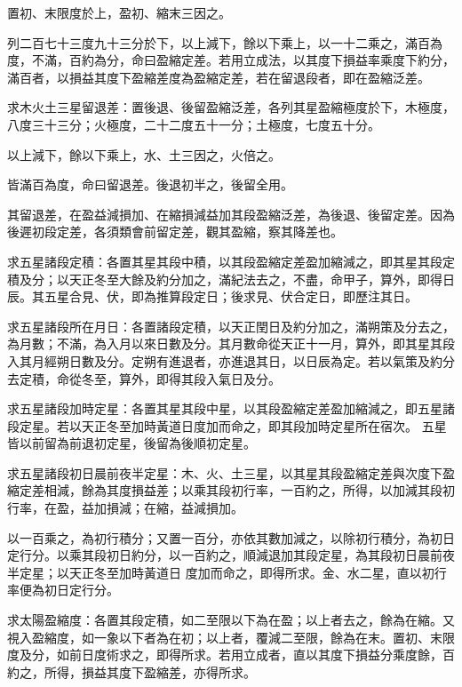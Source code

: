 \begin{pinyinscope}
 置初、末限度於上，盈初、縮末三因之。



 列二百七十三度九十三分於下，以上減下，餘以下乘上，以一十二乘之，滿百為度，不滿，百約為分，命曰盈縮定差。若用立成法，以其度下損益率乘度下約分，滿百者，以損益其度下盈縮差度為盈縮定差，若在留退段者，即在盈縮泛差。



 求木火土三星留退差：置後退、後留盈縮泛差，各列其星盈縮極度於下，木極度，八度三十三分；火極度，二十二度五十一分；土極度，七度五十分。



 以上減下，餘以下乘上，水、土三因之，火倍之。



 皆滿百為度，命曰留退差。後退初半之，後留全用。



 其留退差，在盈益減損加、在縮損減益加其段盈縮泛差，為後退、後留定差。因為後遲初段定差，各須類會前留定差，觀其盈縮，察其降差也。



 求五星諸段定積：各置其星其段中積，以其段盈縮定差盈加縮減之，即其星其段定積及分；以天正冬至大餘及約分加之，滿紀法去之，不盡，命甲子，算外，即得日辰。其五星合見、伏，即為推算段定日；後求見、伏合定日，即歷注其日。



 求五星諸段所在月日：各置諸段定積，以天正閏日及約分加之，滿朔策及分去之，為月數；不滿，為入月以來日數及分。其月數命從天正十一月，算外，即其星其段入其月經朔日數及分。定朔有進退者，亦進退其日，以日辰為定。若以氣策及約分去定積，命從冬至，算外，即得其段入氣日及分。



 求五星諸段加時定星：各置其星其段中星，以其段盈縮定差盈加縮減之，即五星諸段定星。若以天正冬至加時黃道日度加而命之，即其段加時定星所在宿次。
 五星皆以前留為前退初定星，後留為後順初定星。



 求五星諸段初日晨前夜半定星：木、火、土三星，以其星其段盈縮定差與次度下盈縮定差相減，餘為其度損益差；以乘其段初行率，一百約之，所得，以加減其段初行率，在盈，益加損減；在縮，益減損加。



 以一百乘之，為初行積分；又置一百分，亦依其數加減之，以除初行積分，為初日定行分。以乘其段初日約分，以一百約之，順減退加其段定星，為其段初日晨前夜半定星；以天正冬至加時黃道日
 度加而命之，即得所求。金、水二星，直以初行率便為初日定行分。



 求太陽盈縮度：各置其段定積，如二至限以下為在盈；以上者去之，餘為在縮。又視入盈縮度，如一象以下者為在初；以上者，覆減二至限，餘為在末。置初、末限度及分，如前日度術求之，即得所求。若用立成者，直以其度下損益分乘度餘，百約之，所得，損益其度下盈縮差，亦得所求。




\end{pinyinscope}
